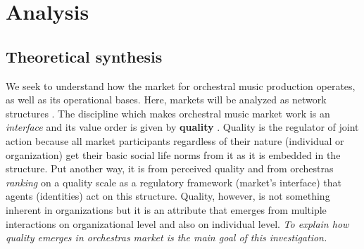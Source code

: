 \documentclass[a4paper, 12pt, openright, oneside, german, french, brazil, english]{abntex2}
\begin{document}
        
	\chapter{Analysis}
	
	\section{Theoretical synthesis}

	
	We seek to understand how the market for orchestral music production operates, as well as its operational bases. Here, markets will be analyzed as network structures \cite{white2002markets}. The discipline which makes orchestral music market work is an \textit{interface} and its value order is given by \textbf{quality} \cite{white2002markets}. Quality is the regulator of joint action because all market participants regardless of their nature (individual or organization) get their basic social life norms from it as it is embedded in the structure. Put another way, it is from perceived quality and from orchestras \textit{ranking} on a quality scale as a regulatory framework (market's interface) that agents (identities) act on this structure. Quality, however, is not something inherent in organizations but it is an attribute that emerges from multiple interactions on organizational level and also on individual level. \textit{To explain how quality emerges in orchestras market is the main goal of this investigation.}
	
\end{document}
